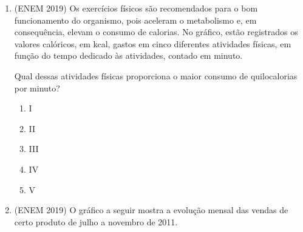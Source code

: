 \begin{enumerate}
\item (ENEM 2019) Os exercícios físicos são recomendados para o bom funcionamento do organismo, pois aceleram o metabolismo e, em consequência, elevam o consumo de calorias. No gráfico, estão registrados os valores calóricos, em kcal, gastos em cinco diferentes atividades físicas, em função do tempo dedicado às atividades, contado em minuto.

\begin{figure}[H]
\centering
{}
\end{figure}

  Qual dessas atividades físicas proporciona o maior consumo de quilocalorias por minuto?

  \begin{enumerate}
  \item I
  \item II
  \item III
  \item IV
  \item V
  \end{enumerate}

\clearpage

\item (ENEM 2019) O gráfico a seguir mostra a evolução mensal das vendas de certo produto de julho a novembro de 2011.

  \begin{center}
\end{center}
\end{enumerate}
